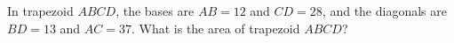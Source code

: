 In trapezoid $ABCD$, the bases are $AB=12$ and $CD=28$, and the diagonals are $BD=13$ and $AC=37$. What is the area of trapezoid $ABCD$?
